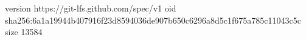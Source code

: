 version https://git-lfs.github.com/spec/v1
oid sha256:6a1a19944b407916f23d8594036de907b650c6296a8d5c1f675a785c11043c5c
size 13584
